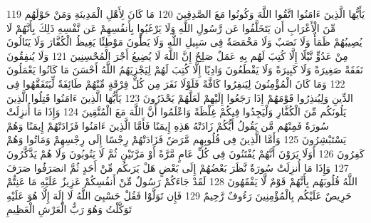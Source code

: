 \documentclass[20pt,a4paper]{article}
\begin{document}
{\tiny\colorbox{cl_aya}{119}} يَأَيُّهَا الَّذِينَ ءَامَنُوا اتَّقُوا اللَّهَ وَكُونُوا مَعَ الصَّدِقِينَ
{\tiny\colorbox{cl_aya}{120}} مَا كَانَ لِأَهْلِ الْمَدِينَةِ وَمَنْ حَوْلَهُم مِّنَ الْأَعْرَابِ أَن يَتَخَلَّفُوا عَن رَّسُولِ اللَّهِ وَلَا يَرْغَبُوا بِأَنفُسِهِمْ عَن نَّفْسِهِ ذَلِكَ بِأَنَّهُمْ لَا يُصِيبُهُمْ ظَمَأٌ وَلَا نَصَبٌ وَلَا مَخْمَصَةٌ فِى سَبِيلِ اللَّهِ وَلَا يَطَُٔونَ مَوْطِئًا يَغِيظُ الْكُفَّارَ وَلَا يَنَالُونَ مِنْ عَدُوٍّ نَّيْلًا إِلَّا كُتِبَ لَهُم بِهِ عَمَلٌ صَلِحٌ إِنَّ اللَّهَ لَا يُضِيعُ أَجْرَ الْمُحْسِنِينَ
{\tiny\colorbox{cl_aya}{121}} وَلَا يُنفِقُونَ نَفَقَةً صَغِيرَةً وَلَا كَبِيرَةً وَلَا يَقْطَعُونَ وَادِيًا إِلَّا كُتِبَ لَهُمْ لِيَجْزِيَهُمُ اللَّهُ أَحْسَنَ مَا كَانُوا يَعْمَلُونَ
{\tiny\colorbox{cl_aya}{122}} وَمَا كَانَ الْمُؤْمِنُونَ لِيَنفِرُوا كَافَّةً فَلَوْلَا نَفَرَ مِن كُلِّ فِرْقَةٍ مِّنْهُمْ طَائِفَةٌ لِّيَتَفَقَّهُوا فِى الدِّينِ وَلِيُنذِرُوا قَوْمَهُمْ إِذَا رَجَعُوا إِلَيْهِمْ لَعَلَّهُمْ يَحْذَرُونَ
{\tiny\colorbox{cl_aya}{123}} يَأَيُّهَا الَّذِينَ ءَامَنُوا قَتِلُوا الَّذِينَ يَلُونَكُم مِّنَ الْكُفَّارِ وَلْيَجِدُوا فِيكُمْ غِلْظَةً وَاعْلَمُوا أَنَّ اللَّهَ مَعَ الْمُتَّقِينَ
{\tiny\colorbox{cl_aya}{124}} وَإِذَا مَا أُنزِلَتْ سُورَةٌ فَمِنْهُم مَّن يَقُولُ أَيُّكُمْ زَادَتْهُ هَذِهِ إِيمَنًا فَأَمَّا الَّذِينَ ءَامَنُوا فَزَادَتْهُمْ إِيمَنًا وَهُمْ يَسْتَبْشِرُونَ
{\tiny\colorbox{cl_aya}{125}} وَأَمَّا الَّذِينَ فِى قُلُوبِهِم مَّرَضٌ فَزَادَتْهُمْ رِجْسًا إِلَى رِجْسِهِمْ وَمَاتُوا وَهُمْ كَفِرُونَ
{\tiny\colorbox{cl_aya}{126}} أَوَلَا يَرَوْنَ أَنَّهُمْ يُفْتَنُونَ فِى كُلِّ عَامٍ مَّرَّةً أَوْ مَرَّتَيْنِ ثُمَّ لَا يَتُوبُونَ وَلَا هُمْ يَذَّكَّرُونَ
{\tiny\colorbox{cl_aya}{127}} وَإِذَا مَا أُنزِلَتْ سُورَةٌ نَّظَرَ بَعْضُهُمْ إِلَى بَعْضٍ هَلْ يَرَىكُم مِّنْ أَحَدٍ ثُمَّ انصَرَفُوا صَرَفَ اللَّهُ قُلُوبَهُم بِأَنَّهُمْ قَوْمٌ لَّا يَفْقَهُونَ
{\tiny\colorbox{cl_aya}{128}} لَقَدْ جَاءَكُمْ رَسُولٌ مِّنْ أَنفُسِكُمْ عَزِيزٌ عَلَيْهِ مَا عَنِتُّمْ حَرِيصٌ عَلَيْكُم بِالْمُؤْمِنِينَ رَءُوفٌ رَّحِيمٌ
{\tiny\colorbox{cl_aya}{129}} فَإِن تَوَلَّوْا فَقُلْ حَسْبِىَ اللَّهُ لَا إِلَهَ إِلَّا هُوَ عَلَيْهِ تَوَكَّلْتُ وَهُوَ رَبُّ الْعَرْشِ الْعَظِيمِ
\end{document}
